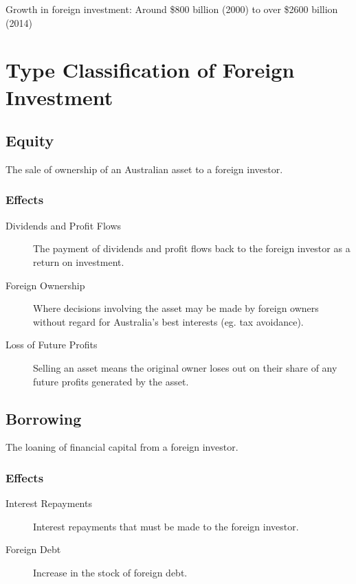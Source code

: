 \documentclass[a4paper,11pt]{article}
\begin{document}
Growth in foreign investment: Around \$800 billion (2000) to over \$2600
billion (2014)



\section{Type Classification of Foreign Investment}

\subsection{Equity}

The sale of ownership of an Australian asset to a foreign investor.


\subsubsection{Effects}

\begin{description}
\item [Dividends and Profit Flows] The payment of dividends and profit flows
	back to the foreign investor as a return on investment.
\item [Foreign Ownership] Where decisions involving the asset may be made by
	foreign owners without regard for Australia's best interests (eg. tax
	avoidance).
\item [Loss of Future Profits] Selling an asset means the original owner loses
	out on their share of any future profits generated by the asset.
\end{description}


\subsection{Borrowing}

The loaning of financial capital from a foreign investor.


\subsubsection{Effects}

\begin{description}
\item [Interest Repayments] Interest repayments that must be made to the
	foreign investor.
\item [Foreign Debt] Increase in the stock of foreign debt.
\end{description}
\end{document}
